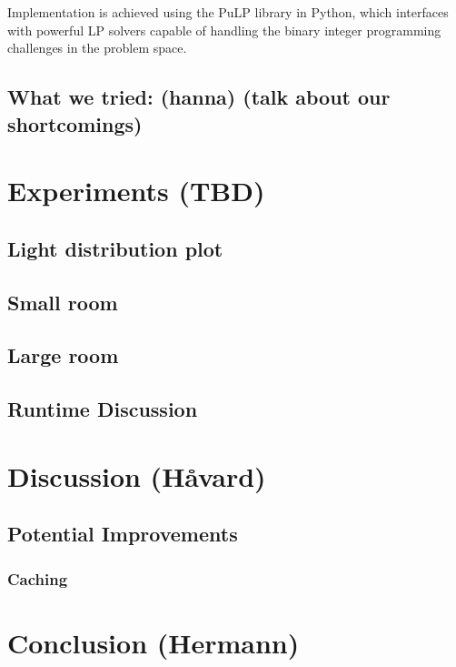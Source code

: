 \documentclass{article}
\begin{document}
Implementation is achieved using the PuLP library in Python, which interfaces with powerful LP solvers capable of handling the binary 
integer programming challenges in the problem space.

\subsection{What we tried: (hanna) (talk about our shortcomings)}

\newpage

\section{Experiments (TBD)}
\subsection{Light distribution plot}
\subsection{Small room}
\subsection{Large room}
\subsection{Runtime Discussion}



\newpage

\section{Discussion (Håvard)}

\subsection{Potential Improvements}
\subsubsection{Caching}

\newpage

\section{Conclusion (Hermann)}
\end{document}
